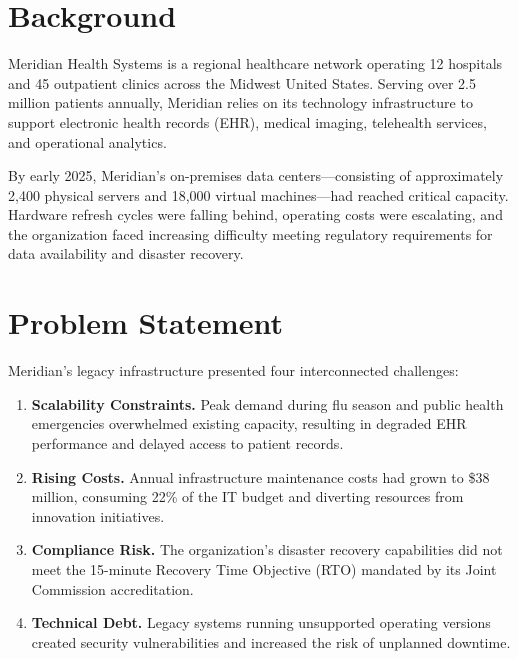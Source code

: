 \documentclass[
    language=english,
    doctype=article,
    institution=none,
]{../../omnilatex}
\begin{document}
\maketitle

\section{Background}

Meridian Health Systems is a regional healthcare network operating 12
hospitals and 45 outpatient clinics across the Midwest United States.
Serving over 2.5 million patients annually, Meridian relies on its
technology infrastructure to support electronic health records (EHR),
medical imaging, telehealth services, and operational analytics.

By early 2025, Meridian's on-premises data centers---consisting of
approximately 2,400 physical servers and 18,000 virtual machines---had
reached critical capacity. Hardware refresh cycles were falling behind,
operating costs were escalating, and the organization faced increasing
difficulty meeting regulatory requirements for data availability and
disaster recovery.

\section{Problem Statement}

Meridian's legacy infrastructure presented four interconnected challenges:

\begin{enumerate}
    \item \textbf{Scalability Constraints.} Peak demand during flu season
        and public health emergencies overwhelmed existing capacity,
        resulting in degraded EHR performance and delayed access to
        patient records.
    \item \textbf{Rising Costs.} Annual infrastructure maintenance costs
        had grown to \$38 million, consuming 22\% of the IT budget and
        diverting resources from innovation initiatives.
    \item \textbf{Compliance Risk.} The organization's disaster recovery
        capabilities did not meet the 15-minute Recovery Time Objective
        (RTO) mandated by its Joint Commission accreditation.
    \item \textbf{Technical Debt.} Legacy systems running unsupported
        operating versions created security vulnerabilities and increased
        the risk of unplanned downtime.
\end{enumerate}
\end{document}
